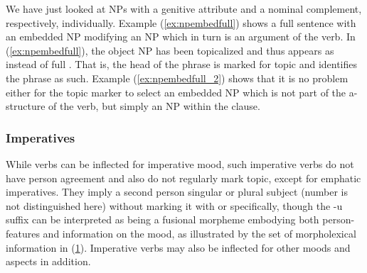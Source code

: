 We have just looked at NPs with a genitive attribute and a nominal complement,
respectively, individually. Example (\ref{ex:npembedfull}) shows a full
sentence with an embedded NP modifying an NP which in turn is an argument of
the verb. In (\ref{ex:npembedfull}), the object NP has been topicalized and
thus appears as  instead of full .
That is, the head of the phrase is marked for topic and identifies the phrase
as such. Example (\ref{ex:npembedfull_2}) shows that it is no problem either
for the topic marker to select an embedded NP which is not part of the
a-structure of the verb, but simply an NP within the clause.

\subsubsection{Imperatives}

While verbs can be inflected for imperative mood, such imperative verbs do not
have person agreement and also do not regularly mark topic, except for emphatic
imperatives. They imply a second person singular or plural subject (number is
not distinguished here) without marking it with  or
 specifically, though the  {-u} suffix can be
interpreted as being a fusional morpheme embodying both person-features and
information on the mood, as illustrated by the set of morpholexical information
in (\ref{ex:impfeat}). Imperative verbs may also be inflected for other moods
and aspects in addition.

\begin{figure}
\begin{morphlex}
\ex\label{ex:impfeat}%
\xe
\end{morphlex}
\end{figure}

